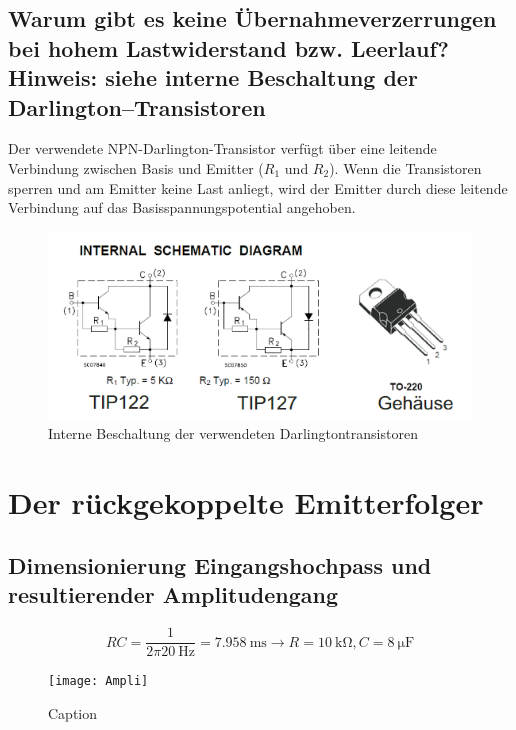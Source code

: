 \subsection{Warum gibt es keine Übernahmeverzerrungen bei hohem Lastwiderstand bzw. Leerlauf?Hinweis: siehe interne Beschaltung der Darlington–Transistoren}

Der verwendete NPN-Darlington-Transistor verfügt über eine leitende Verbindung zwischen Basis und Emitter ($R_1$ und $R_2$). Wenn die Transistoren sperren und am Emitter keine Last anliegt, wird der Emitter durch diese leitende Verbindung auf das Basisspannungspotential angehoben.

\begin{figure}[H]
    \centering
    \includegraphics{tex/7_Leistungsverstaerker/pictures/Darlington.png}
    \caption{Interne Beschaltung der verwendeten Darlingtontransistoren}
\end{figure}

\section{Der rückgekoppelte Emitterfolger}

\subsection{Dimensionierung Eingangshochpass und resultierender Amplitudengang}

\begin{equation}
    RC = \frac{1}{2 \pi \SI{20}{\hertz}} = \SI{7.958}{\milli \second} \rightarrow R = \SI{10}{\kilo \ohm}, C = \SI{8}{\micro \farad}
\end{equation}

\begin{figure}[H]
    \centering
    \texttt{[image: Ampli]}
    \caption{Caption}
    \label{fig:my_label}
\end{figure}


